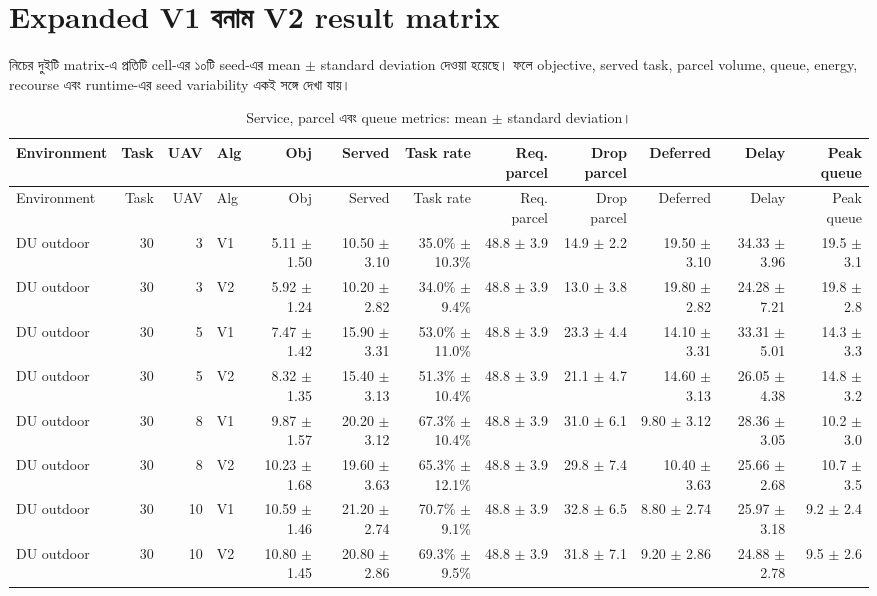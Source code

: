\documentclass[10pt,a4paper]{article}
\begin{document}
\section{Expanded V1 বনাম V2 result matrix}
নিচের দুইটি matrix-এ প্রতিটি cell-এর ১০টি seed-এর mean $\pm$ standard deviation দেওয়া হয়েছে। ফলে objective, served task, parcel volume, queue, energy, recourse এবং runtime-এর seed variability একই সঙ্গে দেখা যায়।
\begin{landscape}\begin{longtable}{@{}lrrlrrrrrrrr@{}}
\caption{Service, parcel এবং queue metrics: mean $\pm$ standard deviation।}\label{tab:v2-service-metrics}\\
\toprule Environment & Task & UAV & Alg & Obj & Served & Task rate & Req. parcel & Drop parcel & Deferred & Delay & Peak queue\\\midrule
\endfirsthead\toprule Environment & Task & UAV & Alg & Obj & Served & Task rate & Req. parcel & Drop parcel & Deferred & Delay & Peak queue\\\midrule\endhead
DU outdoor & 30 & 3 & V1 & 5.11 $\pm$ 1.50 & 10.50 $\pm$ 3.10 & 35.0\% $\pm$ 10.3\% & 48.8 $\pm$ 3.9 & 14.9 $\pm$ 2.2 & 19.50 $\pm$ 3.10 & 34.33 $\pm$ 3.96 & 19.5 $\pm$ 3.1 \\
DU outdoor & 30 & 3 & V2 & 5.92 $\pm$ 1.24 & 10.20 $\pm$ 2.82 & 34.0\% $\pm$ 9.4\% & 48.8 $\pm$ 3.9 & 13.0 $\pm$ 3.8 & 19.80 $\pm$ 2.82 & 24.28 $\pm$ 7.21 & 19.8 $\pm$ 2.8 \\
DU outdoor & 30 & 5 & V1 & 7.47 $\pm$ 1.42 & 15.90 $\pm$ 3.31 & 53.0\% $\pm$ 11.0\% & 48.8 $\pm$ 3.9 & 23.3 $\pm$ 4.4 & 14.10 $\pm$ 3.31 & 33.31 $\pm$ 5.01 & 14.3 $\pm$ 3.3 \\
DU outdoor & 30 & 5 & V2 & 8.32 $\pm$ 1.35 & 15.40 $\pm$ 3.13 & 51.3\% $\pm$ 10.4\% & 48.8 $\pm$ 3.9 & 21.1 $\pm$ 4.7 & 14.60 $\pm$ 3.13 & 26.05 $\pm$ 4.38 & 14.8 $\pm$ 3.2 \\
DU outdoor & 30 & 8 & V1 & 9.87 $\pm$ 1.57 & 20.20 $\pm$ 3.12 & 67.3\% $\pm$ 10.4\% & 48.8 $\pm$ 3.9 & 31.0 $\pm$ 6.1 & 9.80 $\pm$ 3.12 & 28.36 $\pm$ 3.05 & 10.2 $\pm$ 3.0 \\
DU outdoor & 30 & 8 & V2 & 10.23 $\pm$ 1.68 & 19.60 $\pm$ 3.63 & 65.3\% $\pm$ 12.1\% & 48.8 $\pm$ 3.9 & 29.8 $\pm$ 7.4 & 10.40 $\pm$ 3.63 & 25.66 $\pm$ 2.68 & 10.7 $\pm$ 3.5 \\
DU outdoor & 30 & 10 & V1 & 10.59 $\pm$ 1.46 & 21.20 $\pm$ 2.74 & 70.7\% $\pm$ 9.1\% & 48.8 $\pm$ 3.9 & 32.8 $\pm$ 6.5 & 8.80 $\pm$ 2.74 & 25.97 $\pm$ 3.18 & 9.2 $\pm$ 2.4 \\
DU outdoor & 30 & 10 & V2 & 10.80 $\pm$ 1.45 & 20.80 $\pm$ 2.86 & 69.3\% $\pm$ 9.5\% & 48.8 $\pm$ 3.9 & 31.8 $\pm$ 7.1 & 9.20 $\pm$ 2.86 & 24.88 $\pm$ 2.78 & 9.5 $\pm$ 2.6 \\

\end{longtable}
\end{landscape}
\end{document}
